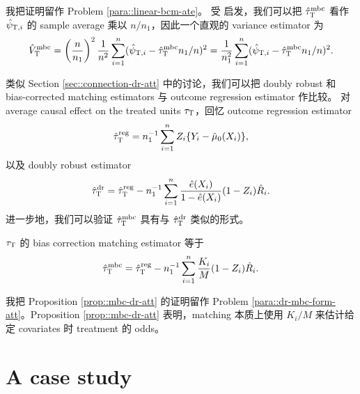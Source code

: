 我把证明留作 Problem \ref{para::linear-bcm-ate}。
受 \citet{otsu2017bootstrap} 启发，我们可以把 $\hat{\tau}_\textsc{T}^\textup{mbc}  $ 看作 $\hat{\psi}_{\textsc{T}, i}$ 的 sample average 乘以 $n/n_1$，因此一个直观的 variance estimator 为
$$
\hat{V}_\textsc{T}^\textup{mbc} =  \left( \frac{n}{n_1} \right)^2 \frac{1}{n^2} \sum_{i=1}^n (\hat{\psi}_{\textsc{T}, i} - \hat{\tau}_\textsc{T}^\textup{mbc} n_1/n)^2 = \frac{1}{n_1^2} \sum_{i=1}^n (\hat{\psi}_{\textsc{T}, i} - \hat{\tau}_\textsc{T}^\textup{mbc} n_1/n )^2.
$$

 
 类似 Section \ref{sec::connection-dr-att} 中的讨论，我们可以把 doubly robust 和 bias-corrected matching estimators 与 outcome regression estimator 作比较。
 对 average causal effect on the treated units $\tau_\textsc{T}$，回忆 outcome regression estimator
$$
\hat{\tau}^{\textup{reg}}_\textsc{T} = n_1^{-1} \sum_{i=1}^n Z_i \{ Y_i - \hat{\mu}_0(X_i) \} ,
$$
以及 doubly robust estimator
$$
\hat{\tau}_\textsc{T}^\textup{dr} =  \hat{\tau}^{\textup{reg}}_\textsc{T} 
- n_1^{-1} \sum_{i=1}^n \frac{  \hat{e}(X_i) }{ 1- \hat{e}(X_i) }  (1-Z_i)  \hat{R}_i .
$$
进一步地，我们可以验证 $\hat{\tau}_\textsc{T}^\textup{mbc} $ 具有与 $\hat{\tau}_\textsc{T}^\textup{dr} $ 类似的形式。
\begin{proposition}
\label{prop::mbc-dr-att}
$\tau_\textsc{T}$ 的 bias correction matching estimator 等于
$$
\hat{\tau}_\textsc{T}^\textup{mbc}   = \hat{\tau}^{\textup{reg}}_\textsc{T} 
 - n_1^{-1} \sum_{i=1}^n { K_i\over M}  (1-Z_i)  \hat{R}_i.
$$
\end{proposition}


我把 Proposition \ref{prop::mbc-dr-att} 的证明留作 Problem \ref{para::dr-mbc-form-att}。Proposition \ref{prop::mbc-dr-att} 表明，matching 本质上使用 $K_i/M$ 来估计给定 covariates 时 treatment 的 odds。




\section{A case study}
\label{sec::matching-application}



